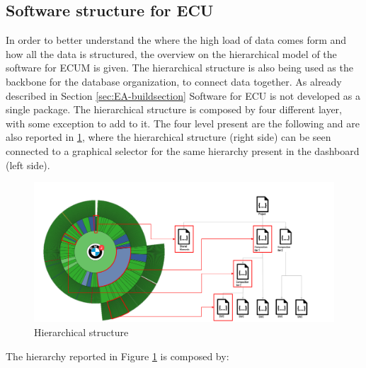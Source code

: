 \documentclass[../main.tex]{subfiles}
\begin{document}
\subsection{Software structure for ECU}
In order to better understand the where the high load of data comes form and how all the data is structured, the overview on the hierarchical model of the software for \gls{ECUM} is given. The hierarchical structure is also being used as the backbone for the database organization, to connect data together.
As already described in Section \ref{sec:EA-buildsection} Software for \gls{ECU} is not developed as a single package. The hierarchical structure is composed by four different layer, with some exception to add to it. The four level present are the following and are also reported in \ref{fig:bcidashboard}, where the hierarchical structure (right side) can be seen connected to a graphical selector for the same hierarchy present in the dashboard (left side).
\begin{figure}[h]
    \centering
    \includegraphics[width=\linewidth]{images_folder/bci_structure.png}
    \caption{Hierarchical structure}
    \label{fig:bcidashboard}
\end{figure}
The hierarchy reported in Figure \ref{fig:bcidashboard} is composed by:
\end{document}
